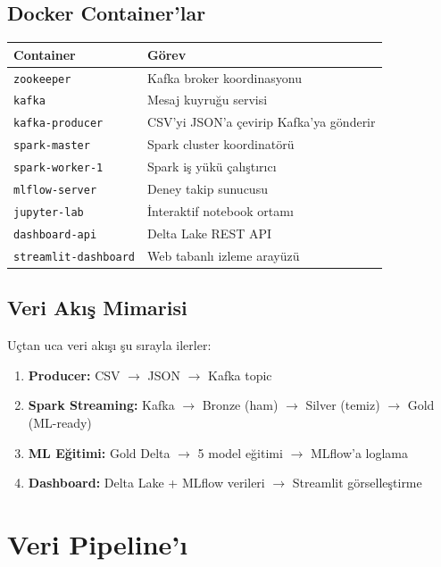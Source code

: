 \documentclass[12pt,a4paper]{article}
\begin{document}
\subsection{Docker Container'lar}
\begin{table}[H]\centering
\begin{tabular}{lp{9cm}}
\toprule
\textbf{Container} & \textbf{Görev} \\
\midrule
\texttt{zookeeper}      & Kafka broker koordinasyonu \\
\texttt{kafka}           & Mesaj kuyruğu servisi \\
\texttt{kafka-producer}  & CSV'yi JSON'a çevirip Kafka'ya gönderir \\
\texttt{spark-master}    & Spark cluster koordinatörü \\
\texttt{spark-worker-1}  & Spark iş yükü çalıştırıcı \\
\texttt{mlflow-server}   & Deney takip sunucusu \\
\texttt{jupyter-lab}     & İnteraktif notebook ortamı \\
\texttt{dashboard-api}   & Delta Lake REST API \\
\texttt{streamlit-dashboard} & Web tabanlı izleme arayüzü \\
\bottomrule
\end{tabular}
\end{table}

\subsection{Veri Akış Mimarisi}
Uçtan uca veri akışı şu sırayla ilerler:

\begin{enumerate}[noitemsep]
  \item \textbf{Producer:} CSV $\to$ JSON $\to$ Kafka topic
  \item \textbf{Spark Streaming:} Kafka $\to$ Bronze (ham) $\to$ Silver (temiz) $\to$ Gold (ML-ready)
  \item \textbf{ML Eğitimi:} Gold Delta $\to$ 5 model eğitimi $\to$ MLflow'a loglama
  \item \textbf{Dashboard:} Delta Lake + MLflow verileri $\to$ Streamlit görselleştirme
\end{enumerate}

\section{Veri Pipeline'ı}
\end{document}
